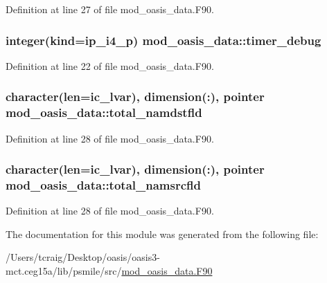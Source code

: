 Definition at line 27 of file mod\+\_\+oasis\+\_\+data.\+F90.

\hypertarget{classmod__oasis__data_a320a34357de5c3049ccf102df7b97f5e}{
\subsubsection[{timer\+\_\+debug}]{\setlength{\rightskip}{0pt plus 5cm}integer(kind=ip\+\_\+i4\+\_\+p) mod\+\_\+oasis\+\_\+data\+::timer\+\_\+debug}}\label{classmod__oasis__data_a320a34357de5c3049ccf102df7b97f5e}


Definition at line 22 of file mod\+\_\+oasis\+\_\+data.\+F90.

\hypertarget{classmod__oasis__data_a81466361b20004007f221dd6a32041f9}{
\subsubsection[{total\+\_\+namdstfld}]{\setlength{\rightskip}{0pt plus 5cm}character(len=ic\+\_\+lvar), dimension(\+:), pointer mod\+\_\+oasis\+\_\+data\+::total\+\_\+namdstfld}}\label{classmod__oasis__data_a81466361b20004007f221dd6a32041f9}


Definition at line 28 of file mod\+\_\+oasis\+\_\+data.\+F90.

\hypertarget{classmod__oasis__data_a58b5a440f274f5dfb942d7e18f12674c}{
\subsubsection[{total\+\_\+namsrcfld}]{\setlength{\rightskip}{0pt plus 5cm}character(len=ic\+\_\+lvar), dimension(\+:), pointer mod\+\_\+oasis\+\_\+data\+::total\+\_\+namsrcfld}}\label{classmod__oasis__data_a58b5a440f274f5dfb942d7e18f12674c}


Definition at line 28 of file mod\+\_\+oasis\+\_\+data.\+F90.



The documentation for this module was generated from the following file\+:\begin{DoxyCompactItemize}
\item 
/\+Users/tcraig/\+Desktop/oasis/oasis3-\/mct.\+ceg15a/lib/psmile/src/\hyperlink{mod__oasis__data_8_f90}{mod\+\_\+oasis\+\_\+data.\+F90}\end{DoxyCompactItemize}

